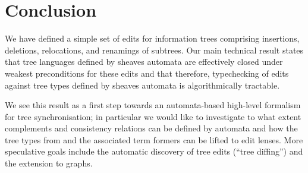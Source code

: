 


\section{Conclusion}
We have defined a simple set of edits for information trees comprising insertions, deletions, relocations, and renamings of subtrees. Our main technical result states that tree languages defined by sheaves automata \cite{DalzilioS:POPL04} are effectively closed under weakest preconditions for these edits and that therefore, typechecking of edits against tree types defined by sheaves automata \cite{Foster:FTL} is algorithmically tractable.

We see this result as a first step towards an automata-based high-level formalism for tree synchronisation; in particular we would like to investigate to what extent complements and consistency relations can be defined by automata and how the tree types from \cite{Foster:FTL} and the associated term formers can be lifted to edit lenses. More speculative goals include the automatic discovery of tree edits (``tree diffing'') and the extension to graphs.
